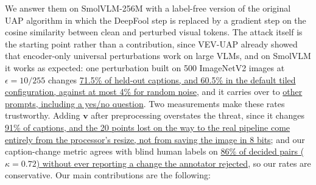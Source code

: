 \documentclass[10pt,twocolumn,letterpaper]{article}
\newcommand{\vv}{\boldsymbol{v}}
\begin{document}
We answer them on SmolVLM-256M with a label-free version of the original UAP algorithm in which the DeepFool step \cite{moosavi2016deepfool} is replaced by a gradient step on the cosine similarity between clean and perturbed visual tokens. The attack itself is the starting point rather than a contribution, since VEV-UAP \cite{kim2024vevuap} already showed that encoder-only universal perturbations work on large VLMs, and on SmolVLM it works as expected: one perturbation built on 500 ImageNetV2 images at $\epsilon=10/255$ changes \hyperref[tab:attack]{71.5\% of held-out captions, and 60.5\% in the default tiled configuration, against at most 4\% for random noise}, and it carries over to \hyperref[tab:attack]{other prompts, including a yes/no question}. Two measurements make these rates trustworthy. Adding $\vv$ after preprocessing overstates the threat, since it changes \hyperref[tab:attack]{91\% of captions, and the 20 points lost on the way to the real pipeline come entirely from the processor's resize, not from saving the image in 8 bits}; and our caption-change metric agrees with blind human labels on \hyperref[tab:metric]{86\% of decided pairs ($\kappa=0.72$) without ever reporting a change the annotator rejected}, so our rates are conservative. Our main contributions are the following:
\end{document}
